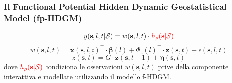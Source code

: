 \begin{frame}
	\frametitle{Il Functional Potential Hidden Dynamic Geostatistical Model (fp-HDGM)}
	\centering
	\begin{equation*}
		y(\mathbf{s}, l, t|\mathcal{S}) = w(\mathbf{s}, l, t)\cdot\textcolor{red}{h_\rho(\mathbf{s}|\mathcal{S})}
	\end{equation*}
	\begin{equation*}
		w(\mathbf{s}, l, t) = \mathbf{x}(\mathbf{s}, l, t)^\top\cdot\boldsymbol{\beta}(l) + \Phi_z(l)^\top\cdot \mathbf{z}(\mathbf{s}, t) + \epsilon(\mathbf{s}, l, t)
	\end{equation*}
	\begin{equation*}
		z(\mathbf{s}, t) = G\cdot\mathbf{z}(\mathbf{s}, t-1) + \boldsymbol{\eta}(\mathbf{s}, t)
	\end{equation*}
	\justifying
	dove $\textcolor{red}{h_\rho(\mathbf{s}|\mathcal{S})}$ condiziona le osservazioni $w(\mathbf{s}, l, t)$ prive della componente interattiva e modellate utilizzando il modello f-HDGM.
\end{frame}

